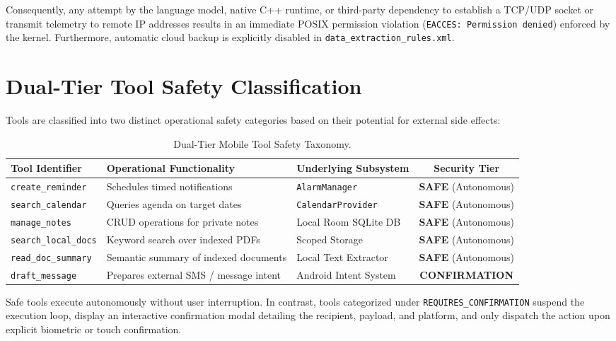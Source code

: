 \documentclass[12pt,a4paper,oneside]{report}
\begin{document}
Consequently, any attempt by the language model, native C++ runtime, or third-party dependency to establish a TCP/UDP socket or transmit telemetry to remote IP addresses results in an immediate POSIX permission violation (\texttt{EACCES: Permission denied}) enforced by the kernel. Furthermore, automatic cloud backup is explicitly disabled in \texttt{data\_extraction\_rules.xml}.

\section{Dual-Tier Tool Safety Classification}
Tools are classified into two distinct operational safety categories based on their potential for external side effects:
\begin{table}[H]
\centering
\caption{Dual-Tier Mobile Tool Safety Taxonomy.}
\label{tab:tools}
\begin{tabularx}{\textwidth}{lXlc}
\toprule
\textbf{Tool Identifier} & \textbf{Operational Functionality} & \textbf{Underlying Subsystem} & \textbf{Security Tier} \\
\midrule
\texttt{create\_reminder} & Schedules timed notifications & \texttt{AlarmManager} & \textbf{SAFE} (Autonomous) \\
\texttt{search\_calendar} & Queries agenda on target dates & \texttt{CalendarProvider} & \textbf{SAFE} (Autonomous) \\
\texttt{manage\_notes} & CRUD operations for private notes & Local Room SQLite DB & \textbf{SAFE} (Autonomous) \\
\texttt{search\_local\_docs} & Keyword search over indexed PDFs & Scoped Storage & \textbf{SAFE} (Autonomous) \\
\texttt{read\_doc\_summary} & Semantic summary of indexed documents & Local Text Extractor & \textbf{SAFE} (Autonomous) \\
\texttt{draft\_message} & Prepares external SMS / message intent & Android Intent System & \textbf{CONFIRMATION} \\
\bottomrule
\end{tabularx}
\end{table}

Safe tools execute autonomously without user interruption. In contrast, tools categorized under \texttt{REQUIRES\_CONFIRMATION} suspend the execution loop, display an interactive confirmation modal detailing the recipient, payload, and platform, and only dispatch the action upon explicit biometric or touch confirmation.
\end{document}
